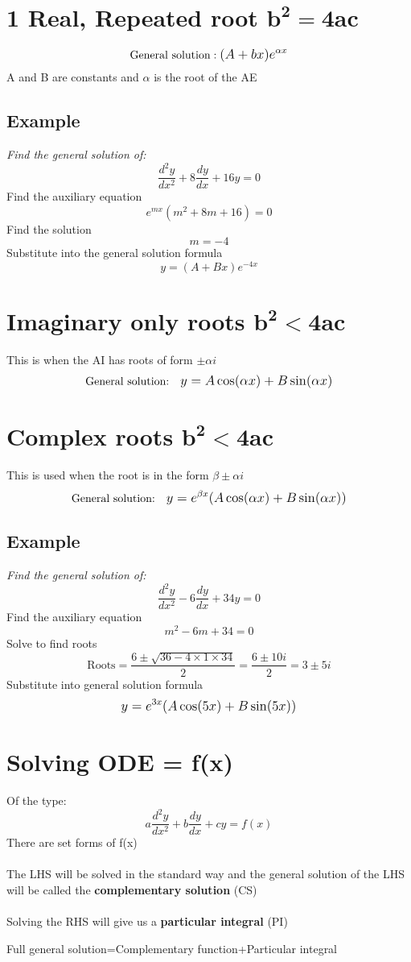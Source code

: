 \documentclass{article}[18pt]
\begin{document}
\section{1 Real, Repeated root $\mathbf{b^2=4ac}$}
$$\textrm{General solution}: \mathlarger{(A+bx)e^{\alpha x}}$$
A and B are constants and $\alpha$ is the root of the AE
\subsection{Example}
\textit{Find the general solution of:}
$$\frac{d^2y}{dx^2}+8\frac{dy}{dx}+16y=0$$
Find the auxiliary equation
$$e^{mx}(m^2+8m+16)=0$$
Find the solution
$$m=-4$$
Substitute into the general solution formula
$$y=(A+Bx)e^{-4x}$$
\section{Imaginary only roots $\mathbf{b^2<4ac}$}
This is when the AI has roots of form $\pm \alpha i$
$$\textrm{General solution:} \quad \mathlarger{y=A\cos(\alpha x)+B\sin(\alpha x)}$$
\newpage
\section{Complex roots $\mathbf{b^2<4ac}$}
This is used when the root is in the form $\beta\pm\alpha i$
$$\textrm{General solution:} \quad \mathlarger{y=e^{\beta x}(A\cos(\alpha x)+B\sin(\alpha x))}$$
\subsection{Example}
\textit{Find the general solution of:}
$$\frac{d^2y}{dx^2}-6\frac{dy}{dx}+34y=0$$
Find the auxiliary equation
$$m^2-6m+34=0$$
Solve to find roots
$$\textrm{Roots}=\frac{6\pm\sqrt{36-4\times1\times34}}{2}=\frac{6\pm10i}{2}=3\pm5i$$
Substitute into general solution formula
$$\mathlarger{y=e^{3x}(A\cos(5x)+B\sin(5x))}$$
\section{Solving  ODE = f(x)}
Of the type:
$$a\frac{d^2y}{dx^2}+b\frac{dy}{dx}+cy=f(x)$$
There are set forms of f(x)\\
\\
The LHS will be solved in the standard way and the general solution of the LHS will be called the \textbf{complementary solution} (CS)\\
\\
Solving the RHS will give us a \textbf{particular integral} (PI)
\begin{center}
Full general solution=Complementary function+Particular integral
\end{center}
\end{document}
